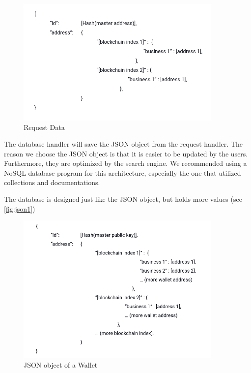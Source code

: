 \begin{figure}[ht!]
    \centering
    \includegraphics[width=0.9\textwidth]{images/design_json.png}
    \caption[Request Data]{Request Data}
    \label{fig:json}
\end{figure}

The database handler will save the JSON object from the request handler. The reason we choose the JSON object is that it is easier to be updated by the users. Furthermore, they are optimized by the search engine. We recommended using a NoSQL database program for this architecture, especially the one that utilized collections and documentations.

The database is designed just like the JSON object, but holds more values (see \autoref{fig:json1})

\begin{figure}[ht!]
    \centering
    \includegraphics[width=0.9\textwidth]{images/json1.png}
    \caption[General JSON object of a Wallet]{JSON object of a Wallet}
    \label{fig:json1}
\end{figure}


